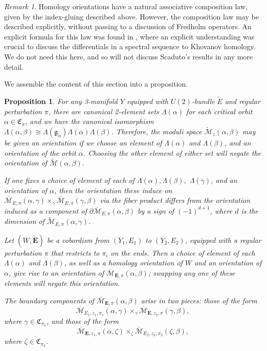 \documentclass[10pt,a4paper]{amsart}
\newtheorem{proposition}[theorem]{Proposition}
\theoremstyle{definition}
\theoremstyle{remark}
\newtheorem{remark}[theorem]{Remark}
\numberwithin{figure}{qchap}
\begin{document}
\begin{remark}Homology orientations have a natural associative composition law, given by the index-gluing described above. However, the composition law may be described explicitly, without passing to a discussion of Fredholm operators. An explicit formula for this law was found in \cite{scaduto2015instantons}, where an explicit understanding was crucial to discuss the differentials in a spectral sequence to Khovanov homology. We do not need this here, and so will not discuss Scaduto's results in any more detail.
\end{remark}

We assemble the content of this section into a proposition.

\begin{proposition}\label{orientations}For any 3-manifold $Y$ equipped with $U(2)$-bundle $\tilde E$ and regular perturbation $\pi$, there are canonical 2-element sets $\Lambda(\alpha)$ for each critical orbit $\alpha \in \mathfrak C_\pi$, and we have the canonical isomorphism $\Lambda(\alpha, \beta) \cong \Lambda(\mathfrak g_\alpha)\Lambda(\alpha) \Lambda(\beta)$. Therefore, the moduli space $\widetilde{\mathcal M}_z(\alpha, \beta)$ may be given an orientation if we choose an element of $\Lambda(\alpha)$ and $\Lambda(\beta)$, and an orientation of the orbit $\alpha$. Choosing the other element of either set will negate the orientation of $\widetilde{\mathcal M}(\alpha, \beta)$.

If one fixes a choice of element of each of $\Lambda(\alpha), \Lambda(\beta), $ $\Lambda(\gamma)$, and an orientation of $\alpha$, then the orientation these induce on $\overline{\mathcal M}_{E,\pi}(\alpha, \gamma) \times_{\gamma} \overline{\mathcal M}_{E,\pi}(\gamma, \beta)$ via the fiber product differs from the orientation induced as a component of $\partial \overline{\mathcal M}_{E,\pi}(\alpha, \beta)$ by a sign of $(-1)^{d+1}$, where $d$ is the dimension of $\widetilde{\mathcal M}_{E,\pi}(\alpha, \gamma)$. 

Let $(W,\widetilde{\mathbf{E}})$ be a cobordism from $(Y_1, E_1)$ to $(Y_2, E_2)$, equipped with a regular perturbation $\pi$ that restricts to $\pi_i$ on the ends. Then a choice of element of each $\Lambda(\alpha)$ and $\Lambda(\beta)$, as well as a homology orientation of $W$ and an orientation of $\alpha$, give rise to an orientation of $\overline{\mathcal M}_{\mathbf{E},\pi}(\alpha, \beta)$; swapping any one of these elements will negate this orientation.

The boundary components of $\overline{\mathcal M}_{\mathbf{E},\pi}(\alpha, \beta)$ arise in two pieces: those of the form 
$$\overline{\mathcal M}_{E_1,z_1,\pi_1}(\alpha, \gamma) \times_\gamma \overline{\mathcal M}_{\mathbf{E},z_2,\pi}(\gamma, \beta),$$ 
where $\gamma \in \mathfrak C_{\pi_1}$, and those of the form 
$$\overline{\mathcal M}_{\mathbf{E},z_1,\pi}(\alpha, \zeta) \times_\zeta \overline{\mathcal M}_{E_2, z_2, \pi_2}(\zeta, \beta),$$ 
where $\zeta \in \mathfrak C_{\pi_2}$.


\end{proposition}
\end{document}

